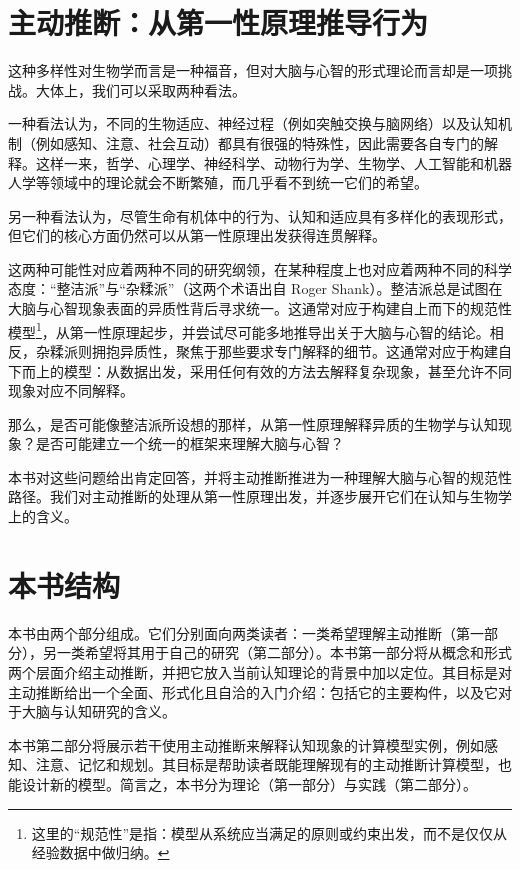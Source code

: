 \section{主动推断：从第一性原理推导行为}

这种多样性对生物学而言是一种福音，但对大脑与心智的形式理论而言却是一项挑战。大体上，我们可以采取两种看法。

一种看法认为，不同的生物适应、神经过程（例如突触交换与脑网络）以及认知机制（例如感知、注意、社会互动）都具有很强的特殊性，因此需要各自专门的解释。这样一来，哲学、心理学、神经科学、动物行为学、生物学、人工智能和机器人学等领域中的理论就会不断繁殖，而几乎看不到统一它们的希望。

另一种看法认为，尽管生命有机体中的行为、认知和适应具有多样化的表现形式，但它们的核心方面仍然可以从第一性原理出发获得连贯解释。

这两种可能性对应着两种不同的研究纲领，在某种程度上也对应着两种不同的科学态度：``整洁派''与``杂糅派''（这两个术语出自 Roger Shank）。整洁派总是试图在大脑与心智现象表面的异质性背后寻求统一。这通常对应于构建自上而下的规范性模型\footnote{这里的``规范性''是指：模型从系统应当满足的原则或约束出发，而不是仅仅从经验数据中做归纳。}，从第一性原理起步，并尝试尽可能多地推导出关于大脑与心智的结论。相反，杂糅派则拥抱异质性，聚焦于那些要求专门解释的细节。这通常对应于构建自下而上的模型：从数据出发，采用任何有效的方法去解释复杂现象，甚至允许不同现象对应不同解释。

那么，是否可能像整洁派所设想的那样，从第一性原理解释异质的生物学与认知现象？是否可能建立一个统一的框架来理解大脑与心智？

本书对这些问题给出肯定回答，并将主动推断推进为一种理解大脑与心智的规范性路径。我们对主动推断的处理从第一性原理出发，并逐步展开它们在认知与生物学上的含义。

\section{本书结构}

本书由两个部分组成。它们分别面向两类读者：一类希望理解主动推断（第一部分），另一类希望将其用于自己的研究（第二部分）。本书第一部分将从概念和形式两个层面介绍主动推断，并把它放入当前认知理论的背景中加以定位。其目标是对主动推断给出一个全面、形式化且自洽的入门介绍：包括它的主要构件，以及它对于大脑与认知研究的含义。

本书第二部分将展示若干使用主动推断来解释认知现象的计算模型实例，例如感知、注意、记忆和规划。其目标是帮助读者既能理解现有的主动推断计算模型，也能设计新的模型。简言之，本书分为理论（第一部分）与实践（第二部分）。

